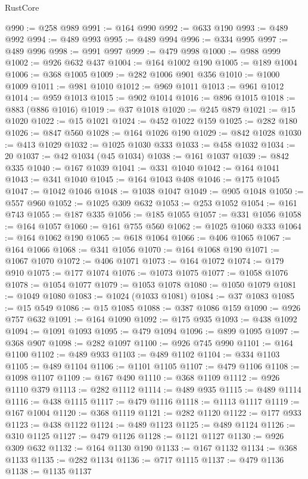 \begin{lexlean}{RustCore}
\begin{coremodule}
@990 := @258 @989
@991 := @164 @990
@992 := @633 @190
@993 := @489 @992
@994 := @489 @993
@995 := @489 @994
@996 := @334 @995
@997 := @489 @996
@998 := @991 @997
@999 := @479 @998
@1000 := @988 @999
@1002 := @926 @632 @437
@1004 := @164 @1002 @190
@1005 := @189 @1004
@1006 := @368 @1005
@1009 := @282 @1006 @901 @356
@1010 := @1000 @1009
@1011 := @981 @1010
@1012 := @969 @1011
@1013 := @961 @1012
@1014 := @959 @1013
@1015 := @902 @1014
@1016 := @896 @1015
@1018 := @883 (@886 @1016)
@1019 := @37 @1018
@1020 := @245 @879
@1021 := @15 @1020
@1022 := @15 @1021
@1024 := @452 @1022 @159
@1025 := @282 @180
@1026 := @847 @560
@1028 := @164 @1026 @190
@1029 := @842 @1028
@1030 := @413 @1029
@1032 := @1025 @1030 @333
@1033 := @458 @1032
@1034 := 20
@1037 := @42 @1034 (@45 @1034)
@1038 := @161 @1037
@1039 := @842 @335
@1040 := @167 @1039
@1041 := @331 @1040
@1042 := @164 @1041
@1043 := @341 @1040
@1045 := @164 @1043 @408
@1046 := @175 @1045
@1047 := @1042 @1046
@1048 := @1038 @1047
@1049 := @905 @1048
@1050 := @557 @960
@1052 := @1025 @309 @632
@1053 := @253 @1052
@1054 := @161 @743
@1055 := @187 @335
@1056 := @185 @1055
@1057 := @331 @1056
@1058 := @164 @1057
@1060 := @161 @755 @560
@1062 := @1025 @1060 @333
@1064 := @164 @1062 @190
@1065 := @618 @1064
@1066 := @406 @1065
@1067 := @164 @1066
@1068 := @341 @1056
@1070 := @164 @1068 @190
@1071 := @1067 @1070
@1072 := @406 @1071
@1073 := @164 @1072
@1074 := @179 @910
@1075 := @177 @1074
@1076 := @1073 @1075
@1077 := @1058 @1076
@1078 := @1054 @1077
@1079 := @1053 @1078
@1080 := @1050 @1079
@1081 := @1049 @1080
@1083 := @1024 (@1033 @1081)
@1084 := @37 @1083
@1085 := @15 @549
@1086 := @15 @1085
@1088 := @387 @1086 @159
@1090 := @926 @757 @632
@1091 := @164 @1090
@1092 := @175 @935
@1093 := @438 @1092
@1094 := @1091 @1093
@1095 := @479 @1094
@1096 := @899 @1095
@1097 := @368 @907
@1098 := @282 @1097
@1100 := @926 @745 @990
@1101 := @164 @1100
@1102 := @489 @933
@1103 := @489 @1102
@1104 := @334 @1103
@1105 := @489 @1104
@1106 := @1101 @1105
@1107 := @479 @1106
@1108 := @1098 @1107
@1109 := @167 @490
@1110 := @368 @1109
@1112 := @926 @1110 @379
@1113 := @282 @1112
@1114 := @489 @935
@1115 := @489 @1114
@1116 := @438 @1115
@1117 := @479 @1116
@1118 := @1113 @1117
@1119 := @167 @1004
@1120 := @368 @1119
@1121 := @282 @1120
@1122 := @177 @933
@1123 := @438 @1122
@1124 := @489 @1123
@1125 := @489 @1124
@1126 := @310 @1125
@1127 := @479 @1126
@1128 := @1121 @1127
@1130 := @926 @309 @632
@1132 := @164 @1130 @190
@1133 := @167 @1132
@1134 := @368 @1133
@1135 := @282 @1134
@1136 := @717 @1115
@1137 := @479 @1136
@1138 := @1135 @1137

\end{coremodule}
\end{lexlean}
